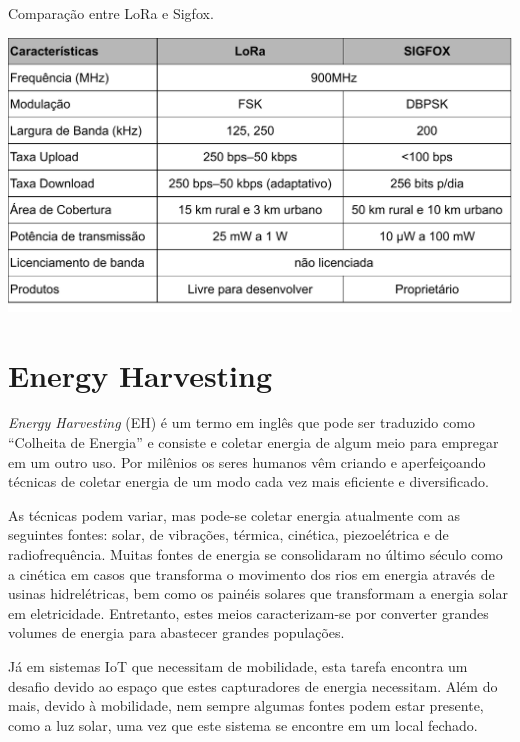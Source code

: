\begin{quadro}
\caption{Comparação entre LoRa e Sigfox.}
\label{qd:LoraVsSigfox}
  \begin{center}
      \includegraphics[scale=0.76]{img/LoraVsSigfox.pdf}
  \end{center}
\end{quadro}


\section{Energy Harvesting}
\textit{Energy Harvesting} (EH) é um termo em inglês que pode ser traduzido como ``Colheita de Energia'' e consiste e coletar energia de algum meio para empregar em um outro uso. Por milênios os seres humanos vêm criando e aperfeiçoando técnicas de coletar energia de um modo cada vez mais eficiente e diversificado.

As técnicas podem variar, mas pode-se coletar energia atualmente com as seguintes fontes: solar, de vibrações, térmica, cinética, piezoelétrica e de radiofrequência. Muitas fontes de energia se consolidaram no último século como a cinética em casos que transforma o movimento dos rios em energia através de usinas hidrelétricas, bem como os painéis solares que transformam a energia solar em eletricidade. Entretanto, estes meios caracterizam-se por converter grandes volumes de energia para abastecer grandes populações. 

Já em sistemas IoT que necessitam de mobilidade, esta tarefa encontra um desafio devido ao espaço que estes capturadores de energia necessitam. Além do mais, devido à mobilidade, nem sempre algumas fontes podem estar presente, como a luz solar, uma vez que este sistema se encontre em um local fechado. 

